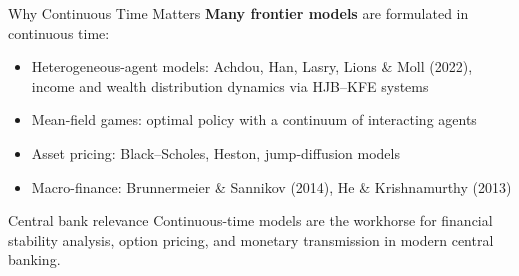 \documentclass[aspectratio=169,11pt]{beamer}
\newcommand{\emphc}[1]{\textcolor{harvardcrimson}{#1}}
\begin{document}
\begin{frame}{Why Continuous Time Matters}
\textbf{Many frontier models} are formulated in continuous time:

\vspace{0.3em}
\begin{itemize}
    \item \emphc{Heterogeneous-agent models:} Achdou, Han, Lasry, Lions \& Moll (2022), income and wealth distribution dynamics via HJB--KFE systems

    \vspace{0.2em}
    \item \emphc{Mean-field games:} optimal policy with a continuum of interacting agents

    \vspace{0.2em}
    \item \emphc{Asset pricing:} Black--Scholes, Heston, jump-diffusion models

    \vspace{0.2em}
    \item \emphc{Macro-finance:} Brunnermeier \& Sannikov (2014), He \& Krishnamurthy (2013)
\end{itemize}

\vspace{0.5em}
\begin{block}{Central bank relevance}
Continuous-time models are the workhorse for \emphc{financial stability analysis}, \emphc{option pricing}, and \emphc{monetary transmission} in modern central banking.
\end{block}
\end{frame}
\end{document}
